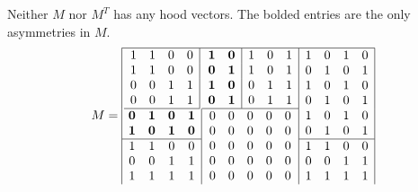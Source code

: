 \begin{example}\label{ex:logarithmic}Neither $M$ nor $M^T$ has any hood vectors. The bolded entries are the only asymmetries in $M$.
\[ \linespread{1}\selectfont M = 
	\begin{array}{|@{}c@{}c@{}|@{}c@{}|}\hline
		\begin{array}{cccc|}
			1	&1	&0	&0\\
			1	&1	&0	&0\\
			0	&0	&1	&1\\
			0	&0	&1	&1\\\hline
		\end{array}
		&\begin{array}{cc|ccc}
			\AJbf1	&\AJbf0	&1	&0	&1\\
			\AJbf0	&\AJbf1	&1	&0	&1\\
			\AJbf1	&\AJbf0	&0	&1	&1\\
			\AJbf0	&\AJbf1	&0	&1	&1\\\hline
		\end{array}&\begin{array}{cccc}
			1	&0	&1	&0\\
			0	&1	&0	&1\\
			1	&0	&1	&0\\
			0	&1	&0	&1\\
		\end{array}\\
		\begin{array}{cccc|}
			\AJbf0	&\AJbf1	&\AJbf0	&\AJbf1\\
			\AJbf1	&\AJbf0	&\AJbf1	&\AJbf0\\\hline
			1	&1	&0	&0\\
			0	&0	&1	&1\\
			1	&1	&1	&1\\
		\end{array}&\begin{array}{ccccc}
			0	&0	&0	&0	&0\\
			0	&0	&0	&0	&0\\
			0	&0	&0	&0	&0\\
			0	&0	&0	&0	&0\\
			0	&0	&0	&0	&0\\
		\end{array}&\begin{array}{cccc}
			1	&0	&1	&0\\
			0	&1	&0	&1\\\hline 
			1	&1	&0	&0\\
			0	&0	&1	&1\\
			1	&1	&1	&1\\

\end{array}
\end{array}\]
\end{example}

